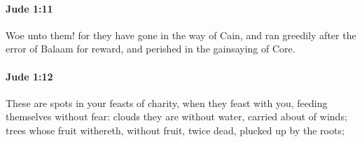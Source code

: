 		\paragraph{Jude 1:11} %
			\label{JUDE-1-11}

			Woe unto them! for they have gone in the way of Cain, and ran greedily after the error of Balaam for reward, and perished in the gainsaying of Core.

			\begin{framed}
			\scriptsize
				\begin{compactdesc}
					\item[SBLG] 
				\end{compactdesc}
			\end{framed}

		\paragraph{Jude 1:12} %
			\label{JUDE-1-12}

			These are spots in your feasts of charity, when they feast with you, feeding themselves without fear: clouds they are without water, carried about of winds; trees whose fruit withereth, without fruit, twice dead, plucked up by the roots;


